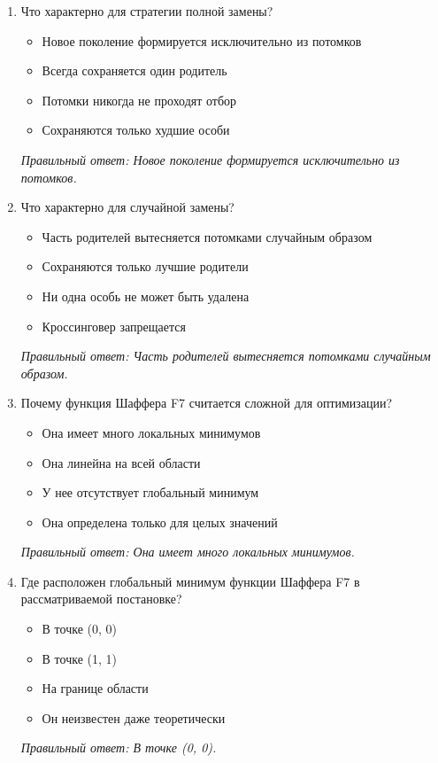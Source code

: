 \begin{enumerate}[label=\textbf{\arabic*.}, leftmargin=0pt, itemsep=1.2em]
\item Что характерно для стратегии полной замены?
\begin{itemize}[label=$\square$, leftmargin=1.5cm, itemsep=0.2em, topsep=0.3em]
\item Новое поколение формируется исключительно из потомков
\item Всегда сохраняется один родитель
\item Потомки никогда не проходят отбор
\item Сохраняются только худшие особи
\end{itemize}
{\small\textit{Правильный ответ: Новое поколение формируется исключительно из потомков.}}

\item Что характерно для случайной замены?
\begin{itemize}[label=$\square$, leftmargin=1.5cm, itemsep=0.2em, topsep=0.3em]
\item Часть родителей вытесняется потомками случайным образом
\item Сохраняются только лучшие родители
\item Ни одна особь не может быть удалена
\item Кроссинговер запрещается
\end{itemize}
{\small\textit{Правильный ответ: Часть родителей вытесняется потомками случайным образом.}}

\item Почему функция Шаффера F7 считается сложной для оптимизации?
\begin{itemize}[label=$\square$, leftmargin=1.5cm, itemsep=0.2em, topsep=0.3em]
\item Она имеет много локальных минимумов
\item Она линейна на всей области
\item У нее отсутствует глобальный минимум
\item Она определена только для целых значений
\end{itemize}
{\small\textit{Правильный ответ: Она имеет много локальных минимумов.}}

\item Где расположен глобальный минимум функции Шаффера F7 в рассматриваемой постановке?
\begin{itemize}[label=$\square$, leftmargin=1.5cm, itemsep=0.2em, topsep=0.3em]
\item В точке (0, 0)
\item В точке (1, 1)
\item На границе области
\item Он неизвестен даже теоретически
\end{itemize}
{\small\textit{Правильный ответ: В точке (0, 0).}}


\end{enumerate}
